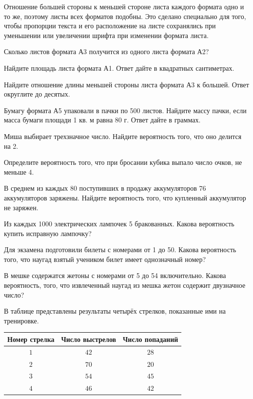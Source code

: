 \begin{class}[number=4]
\begin{listofex}
\begin{center}
		\end{center}
		Отношение большей стороны к меньшей стороне листа каждого формата одно и то же, поэтому листы всех форматов подобны. Это сделано специально для того, чтобы пропорции текста и его расположение на
		листе сохранялись при уменьшении или увеличении шрифта при изменении формата листа.
		\item Сколько листов формата А3 получится из одного листа формата А2?
		\item Найдите площадь листа формата А1. Ответ дайте в квадратных сантиметрах.
		\item Найдите отношение длины меньшей стороны листа формата А3 к большей. Ответ округлите до
		десятых.
		\item Бумагу формата А5 упаковали в пачки по 500 листов. Найдите массу пачки, если масса бумаги
		площади 1 кв. м равна 80 г. Ответ дайте в граммах.
		\item Миша выбирает трехзначное число. Найдите вероятность того, что оно делится на 2.
		\item Определите вероятность того, что при бросании кубика выпало число очков, не меньше 4.
		\item В среднем из каждых 80 поступивших в продажу аккумуляторов 76 аккумуляторов заряжены. Найдите вероятность того, что купленный аккумулятор не заряжен.
		\item Из каждых 1000 электрических лампочек 5 бракованных. Какова вероятность купить исправную лампочку?
		\item Для экзамена подготовили билеты с номерами от 1 до 50. Какова вероятность того, что наугад взятый учеником билет имеет однозначный номер?
		\item В мешке содержатся жетоны с номерами от 5 до 54 включительно. Какова вероятность, того, что извлеченный наугад из мешка жетон содержит двузначное число?
		\item В таблице представлены результаты четырёх стрелков, показанные ими на тренировке.
		\begin{center}
			\footnotesize
			\begin{tabular}{|c|c|c|}
				\hline
				\rowcolor{gray}\textbf{Номер стрелка}&\textbf{Число выстрелов}&\textbf{Число попаданий}\\
				\hline
				\( 1 \)&\( 42 \)&\( 28 \)\\
				\hline
				\( 2 \)&\( 70 \)&\( 20 \)\\
				\hline
				\( 3 \)&\( 54 \)&\( 45 \)\\
				\hline
				\( 4 \)&\( 46 \)&\( 42 \)\\
				\hline
			\end{tabular}
		\end{center}
		

\end{listofex}
\end{class}
